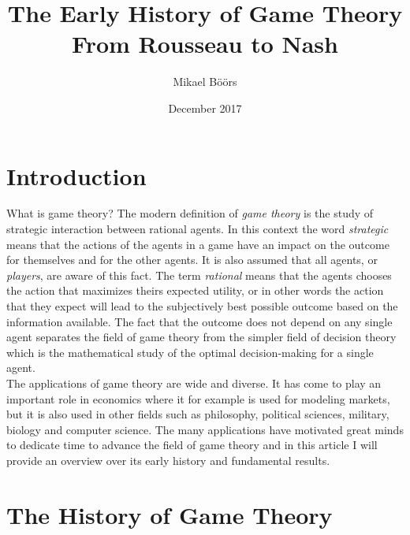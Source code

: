 \documentclass{article}
\title{The Early History of Game Theory\\
  \large From Rousseau to Nash}
\author{Mikael Böörs}
\affil{University of Gothenburg}
\date{December 2017}
\theoremstyle{definition}
\theoremstyle{remark}
\begin{document}
\maketitle
\thispagestyle{empty}
\newpage
\cleardoublepage
\setcounter{page}{1}

\section{Introduction}
What is game theory? The modern definition of \emph{game theory} is
the study of strategic interaction between rational agents. In this
context the word \emph{strategic} means that the actions of the agents
in a game have an impact on the outcome for themselves and
for the other agents. It is also assumed that all agents, or \emph{players}, are aware of
this fact. The term \emph{rational} means that the agents chooses the
action that maximizes theirs expected utility, or in other words the
action that they expect will lead to the subjectively best possible
outcome based on the information available. The fact that the outcome
does not depend on any single agent separates the field of game theory
from the simpler field of decision theory which is the mathematical
study of the optimal decision-making for a single agent.\\

The applications of game theory are wide and diverse. It has come to
play an important role in economics where it for example is used for
modeling markets, but it is also used in other fields such as
philosophy, political sciences, military, biology and computer
science. \citep{Maschler} The many applications have motivated great
minds to dedicate time to advance the field of game theory and in this
article I will provide an overview over its early history and
fundamental results.

\section{The History of Game Theory}\label{The History of Game Theory}
\end{document}
